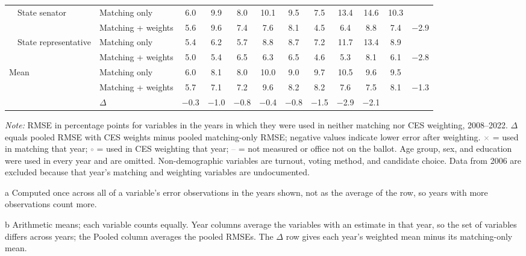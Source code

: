 \begin{table}[!htbp]
{\begin{threeparttable}
\begin{tabular}{llcccccccccc}
\addlinespace[0.1em]
~~State senator & Matching only & 6.0 & 9.9 & 8.0 & 10.1 & 9.5 & 7.5 & 13.4 & 14.6 & 10.3 & \\
 & Matching + weights & 5.6 & 9.6 & 7.4 & 7.6 & 8.1 & 4.5 & 6.4 & 8.8 & 7.4 & $-$2.9 \\
\addlinespace[0.1em]
~~State representative & Matching only & 5.4 & 6.2 & 5.7 & 8.8 & 8.7 & 7.2 & 11.7 & 13.4 & 8.9 & \\
 & Matching + weights & 5.0 & 5.4 & 6.5 & 6.3 & 6.5 & 4.6 & 5.3 & 8.1 & 6.1 & $-$2.8 \\
\midrule
Mean\tnote{b} & Matching only & 6.0 & 8.1 & 8.0 & 10.0 & 9.0 & 9.7 & 10.5 & 9.6 & 9.5 & \\
 & Matching + weights & 5.7 & 7.1 & 7.2 & 9.6 & 8.2 & 8.2 & 7.6 & 7.5 & 8.1 & $-$1.3 \\
 & $\Delta$ & $-$0.3 & $-$1.0 & $-$0.8 & $-$0.4 & $-$0.8 & $-$1.5 & $-$2.9 & $-$2.1 & & \\
\bottomrule
\end{tabular}
\begin{tablenotes}
\footnotesize
\item \textit{Note:} RMSE in percentage points for variables in the years in which they were used in neither matching nor CES weighting, 2008--2022. $\Delta$ equals pooled RMSE with CES weights minus pooled matching-only RMSE; negative values indicate lower error after weighting. \textcolor{gray}{$\times$} = used in matching that year; \textcolor{gray}{$\circ$} = used in CES weighting that year; \textcolor{gray}{--} = not measured or office not on the ballot. Age group, sex, and education were used in every year and are omitted. Non-demographic variables are turnout, voting method, and candidate choice. Data from 2006 are excluded because that year's matching and weighting variables are undocumented.
\item[a] Computed once across all of a variable's error observations in the years shown, not as the average of the row, so years with more observations count more.
\item[b] Arithmetic means; each variable counts equally. Year columns average the variables with an estimate in that year, so the set of variables differs across years; the Pooled column averages the pooled RMSEs. The $\Delta$ row gives each year's weighted mean minus its matching-only mean.
\end{tablenotes}
\end{threeparttable}%
}
\end{table}